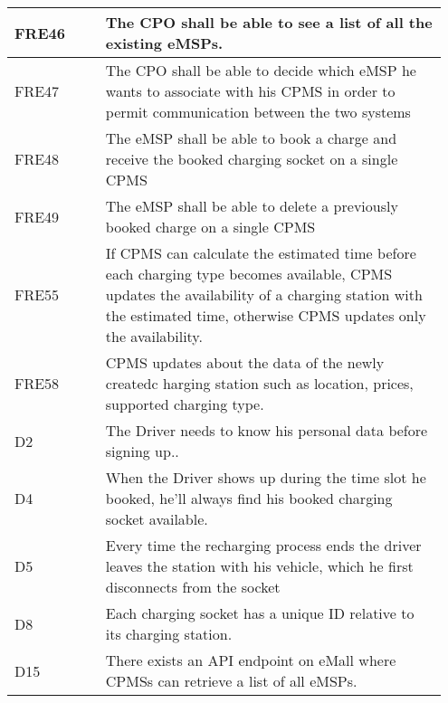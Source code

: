 {\begin{longtable}{|p{0.20\linewidth}p{0.75\linewidth}|}
    \hline
    \rowcolor{bluepoli!15}
    FRE46 & The CPO shall be able to see a list of all the existing eMSPs. \\
    \hline
    \rowcolor{bluepoli!15} FRE47 &  The CPO shall be able to decide which eMSP he wants to associate with his CPMS in order to permit communication between the two systems \\
    \hline
    \rowcolor{bluepoli!15} FRE48 & The eMSP shall be able to book a charge and receive the booked charging socket on a single CPMS \\
    \hline
    \rowcolor{bluepoli!15} FRE49 & The eMSP shall be able to delete a previously booked charge on a single CPMS\\
    \hline
    \rowcolor{bluepoli!15} FRE55 & If CPMS can calculate the estimated time before each charging type becomes available, CPMS updates the availability of a charging station with the estimated time, otherwise CPMS updates only the availability. \\
    \hline
    \rowcolor{bluepoli!15} FRE58 & CPMS updates about the data of the newly createdc harging station such as location, prices, supported charging type. \\
    \hline
    \rowcolor{bluepoli!5} D2 & The Driver needs to know his personal data before signing up.. \\
    \hline 
    \rowcolor{bluepoli!5} D4 & When the Driver shows up during the time slot he booked, he’ll always find his booked charging socket available. \\
    \hline  
    \rowcolor{bluepoli!5} D5 & Every time the recharging process ends the driver leaves the station with his vehicle, which he first disconnects from the socket \\
    \hline  
    \rowcolor{bluepoli!5} D8 & Each charging socket has a unique ID relative to its charging station. \\
    \hline    
    \rowcolor{bluepoli!5} D15 & There exists an API endpoint on eMall where CPMSs can retrieve a list of all eMSPs.\\
    \hline 
\end{longtable}}
